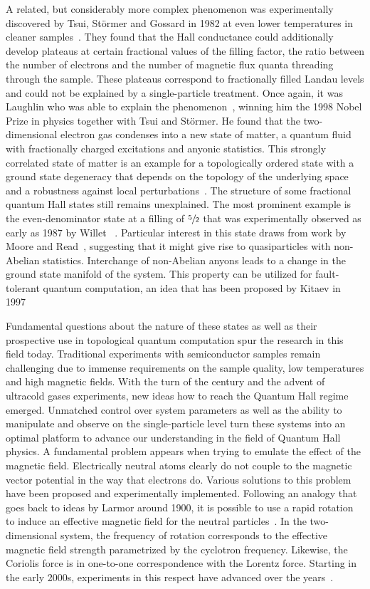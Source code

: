A related, but considerably more complex phenomenon was experimentally discovered by Tsui, Störmer and Gossard in 1982 at even lower temperatures in cleaner samples~\cite{Tsui1982}.
They found that the Hall conductance could additionally develop plateaus at certain fractional values of the filling factor, the ratio between the number of electrons and the number of magnetic flux quanta threading through the sample.
These plateaus correspond to fractionally filled Landau levels and could not be explained by a single-particle treatment.
Once again, it was Laughlin who was able to explain the phenomenon~\cite{Laughlin1983}, winning him the 1998 Nobel Prize in physics together with Tsui and Störmer.
He found that the two-dimensional electron gas condenses into a new state of matter, a quantum fluid with fractionally charged excitations and anyonic statistics.
This strongly correlated state of matter is an example for a topologically ordered state with a ground state degeneracy that depends on the topology of the underlying space and a robustness against local perturbations~\cite{Wen1990,Wen1995}.
The structure of some fractional quantum Hall states still remains unexplained.
The most prominent example is the even-denominator state at a filling of $\sfrac{5}{2}$ that was experimentally observed as early as 1987 by Willet \etal~\cite{Willett1987}.
Particular interest in this state draws from work by Moore and Read~\cite{Moore1991}, suggesting that it might give rise to quasiparticles with non-Abelian statistics.
Interchange of non-Abelian anyons leads to a change in the ground state manifold of the system. This property can be utilized for fault-tolerant quantum computation, an idea that has been proposed by Kitaev in 1997~\cite{Kitaev2003}

Fundamental questions about the nature of these states as well as their prospective use in topological quantum computation spur the research in this field today.
Traditional experiments with semiconductor samples remain challenging due to immense requirements on the sample quality, low temperatures and high magnetic fields.
With the turn of the century and the advent of ultracold gases experiments, new ideas how to reach the Quantum Hall regime emerged.
Unmatched control over system parameters as well as the ability to manipulate and observe on the single-particle level turn these systems into an optimal platform to advance our understanding in the field of Quantum Hall physics.
A fundamental problem appears when trying to emulate the effect of the magnetic field.
Electrically neutral atoms clearly do not couple to the magnetic vector potential in the way that electrons do.
Various solutions to this problem have been proposed and experimentally implemented.
Following an analogy that goes back to ideas by Larmor around 1900, it is possible to use a rapid rotation to induce an effective magnetic field for the neutral particles~\cite{Larmor1900}.
In the two-dimensional system, the frequency of rotation corresponds to the effective magnetic field strength parametrized by the cyclotron frequency.
Likewise, the Coriolis force is in one-to-one correspondence with the Lorentz force.
Starting in the early 2000s, experiments in this respect have advanced over the years~\cite{Schweikhard2004,Bretin2004,Cooper2008,Fetter2009}.


